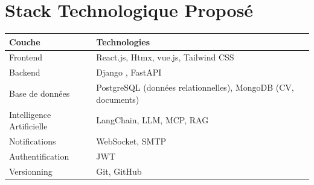 \documentclass[11pt,a4paper]{report}
\begin{document}
\section{Stack Technologique Proposé}

\begin{tcolorbox}[enhanced, colback=lightgray, colframe=primarycolor, arc=3mm, boxrule=1pt, breakable]
    \begin{tabular}{|p{4cm}|p{9cm}|}
        \hline
        \rowcolor{primarycolor!20}
        \textbf{Couche}           & \textbf{Technologies} \\
        \hline
        Frontend                  & React.js, Htmx, vue.js, Tailwind CSS \\
        \hline
        Backend                   & Django , FastAPI \\
        \hline
        Base de données           & PostgreSQL (données relationnelles), MongoDB (CV, documents) \\
        \hline
        Intelligence Artificielle & LangChain, LLM, MCP, RAG \\
        \hline
        Notifications             & WebSocket, SMTP \\
        \hline
        Authentification          & JWT \\
        \hline
        Versionning               & Git, GitHub \\
        \hline
    \end{tabular}
\end{tcolorbox}
\end{document}
